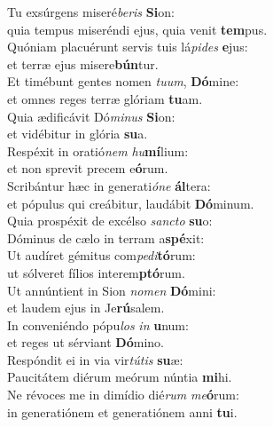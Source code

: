 \evenverse Tu exsúrgens miseré\textit{be}\textit{ris} \textbf{Si}on:~\*\\
\evenverse quia tempus miseréndi ejus, quia venit \textbf{tem}pus.\\
\oddverse Quóniam placuérunt servis tuis lá\textit{pi}\textit{des} \textbf{e}jus:~\*\\
\oddverse et terræ ejus misere\textbf{bún}tur.\\
\evenverse Et timébunt gentes nomen \textit{tu}\textit{um}, \textbf{Dó}mine:~\*\\
\evenverse et omnes reges terræ glóriam \textbf{tu}am.\\
\oddverse Quia ædificávit Dó\textit{mi}\textit{nus} \textbf{Si}on:~\*\\
\oddverse et vidébitur in glória \textbf{su}a.\\
\evenverse Respéxit in oratió\textit{nem} \textit{hu}\textbf{mí}lium:~\*\\
\evenverse et non sprevit precem e\textbf{ó}rum.\\
\oddverse Scribántur hæc in generati\textit{ó}\textit{ne} \textbf{ál}tera:~\*\\
\oddverse et pópulus qui creábitur, laudábit \textbf{Dó}minum.\\
\evenverse Quia prospéxit de excélso \textit{san}\textit{cto} \textbf{su}o:~\*\\
\evenverse Dóminus de cælo in terram a\textbf{spé}xit:\\
\oddverse Ut audíret gémitus com\textit{pe}\textit{di}\textbf{tó}rum:~\*\\
\oddverse ut sólveret fílios interem\textbf{ptó}rum.\\
\evenverse Ut annúntient in Sion \textit{no}\textit{men} \textbf{Dó}mini:~\*\\
\evenverse et laudem ejus in Je\textbf{rú}salem.\\
\oddverse In conveniéndo pópu\textit{los} \textit{in} \textbf{u}num:~\*\\
\oddverse et reges ut sérviant \textbf{Dó}mino.\\
\evenverse Respóndit ei in via vir\textit{tú}\textit{tis} \textbf{su}æ:~\*\\
\evenverse Paucitátem diérum meórum núntia \textbf{mi}hi.\\
\oddverse Ne révoces me in dimídio dié\textit{rum} \textit{me}\textbf{ó}rum:~\*\\
\oddverse in generatiónem et generatiónem anni \textbf{tu}i.\\
